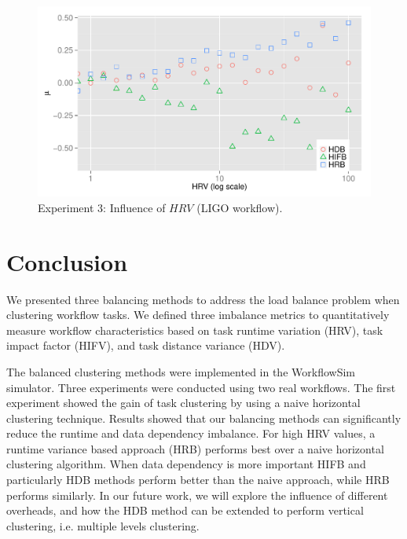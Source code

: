 \documentclass[final]{IEEEtran}
\begin{document}
\begin{figure}[htb]
\centering
	\includegraphics[width=\linewidth]{figure/exp3.pdf}
	\caption{Experiment 3: Influence of $HRV$ (LIGO workflow).}
	\label{fig:incluence_of_hrv}
	\vspace{-10pt}
\end{figure}


\section{Conclusion}

We presented three balancing methods to address the load balance problem when clustering workflow tasks. We defined three imbalance metrics to quantitatively measure workflow characteristics based on task runtime variation (HRV), task impact factor (HIFV), and task distance variance (HDV).

The balanced clustering methods were implemented in the WorkflowSim simulator. Three experiments were conducted using two real workflows. The first experiment showed the gain of task clustering by using a naive horizontal clustering technique. Results showed that our balancing methods can significantly reduce the runtime and data dependency imbalance. For high HRV values, a runtime variance based approach (HRB) performs best over a naive horizontal clustering algorithm. When data dependency is more important HIFB and particularly HDB methods perform better than the naive approach, while HRB performs similarly.
In our future work, we will explore the influence of different overheads, and how the HDB method can be extended to perform vertical clustering, i.e. multiple levels clustering.




\end{document}

